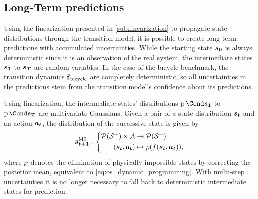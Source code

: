 \subsection{Long-Term predictions}
Using the linearization presented in \cref{sub:linearization} to propagate state distributions through the transition model, it is possible to create long-term predictions with accumulated uncertainties.
While the starting state $\bm{s_0}$ is always deterministic since it is an observation of the real system, the intermediate states $\bm{s_1}$ to $\bm{s_T}$ are random variables.
In the case of the bicycle benchmark, the transition dynamics $\operatorname{\operatorname{\mathbf{f}}_{\text{bicycle}}}$ are completely deterministic, so all uncertainties in the predictions stem from the transition model's confidence about its predictions.

Using linearization, the intermediate states' distributions $\Prob{\rv{s_1}}$ to $\Prob{\rv{s_T}}$ are multivariate Gaussians.
Given a pair of a state distribution $\bm{s_t}$ and an action $\bm{a_t}$, the distribution of the successive state is given by
\begin{align}
    \ms{\mat{s_{t+1}}} \colon \left\{
        \begin{aligned}
            \Dists(\Es^+) \times \Ah &\to \Dists(\Es^+) \\
            (\rv{s_t}, \mat{a_t}) &\mapsto \squeeze(f(\rv{s_t}, \mat{a_t})),
    \end{aligned}
    \right.
\end{align}
where $\squeeze$ denotes the elimination of physically impossible states by correcting the posterior mean, equivalent to \cref{eq:os_dynamic_programming}.
With multi-step uncertainties it is no longer necessary to fall back to deterministic intermediate states for prediction.

